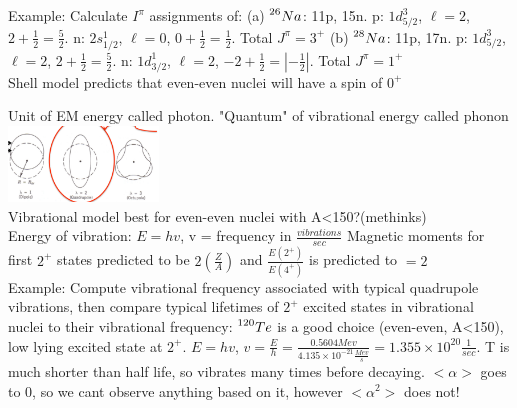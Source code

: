 \documentclass{article}
\begin{document}
\begin{multicols}{3}
Example: Calculate $I^{\pi}$ assignments of: (a) $ \prescript{26}{}{Na} $: 11p, 15n.  p: $1d_{5/2}^{3}$, $\ell = 2$, $2 + \frac{1}{2} = \frac{5}{2}$. n: $2s_{1/2}^{1}$, $\ell = 0$, $0 + \frac{1}{2} = \frac{1}{2	}$.  Total $J^{\pi} = 3^{+}$ (b)  $ \prescript{28}{}{Na} $: 11p, 17n.  p: $1d_{5/2}^{3}$, $\ell = 2$, $2 + \frac{1}{2} = \frac{5}{2}$. n: $1d_{3/2}^{1}$, $\ell = 2$, $-2 + \frac{1}{2} = |-\frac{1}{2}|$.  Total $J^{\pi} = 1^{+}$ \\
Shell model predicts that even-even nuclei will have a spin of $0^{+}$

Unit of EM energy called photon.  "Quantum" of vibrational energy called phonon\\
\includegraphics[width=4cm]{images/vibrations.jpg}\\
Vibrational model best for even-even nuclei with A<150?(methinks)\\
Energy of vibration: $E = hv$, v = frequency in $\frac{vibrations}{sec}$
Magnetic moments for first $2^{+}$ states predicted to be $2(\frac{Z}{A})$ and $\frac{E(2^{+})}{E(4^{+})}$ is predicted to $=2$ \\
Example:  Compute vibrational frequency associated with typical quadrupole vibrations, then compare typical lifetimes of $2^{+}$ excited states in vibrational nuclei to their vibrational frequency:  $\prescript{120}{}{Te}$ is a good choice (even-even, A<150), low lying excited state at $2^{+}$.  $E = hv$, $v = \frac{E}{h} = \frac{0.5604Mev}{4.135\times10^{-21}\frac{Mev}{s}} = 1.355\times10^{20}\frac{1}{sec}$.  T is much shorter than half life, so vibrates many times before decaying. $<\alpha>$ goes to 0, so we cant observe anything based on it, however $<\alpha^{2}>$ does not!


\end{multicols}
\end{document}
